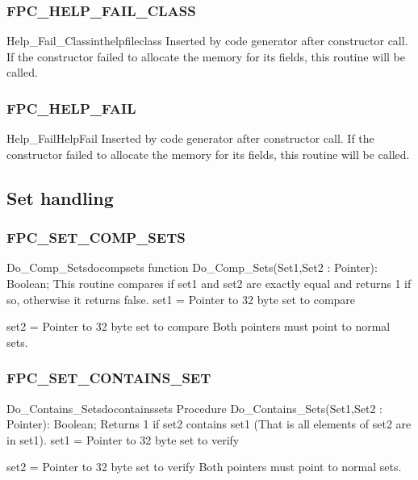 \documentclass [a4paper,12pt]{article}
\begin{document}
\subsubsection{FPC{\_}HELP{\_}FAIL{\_}CLASS}
\label{subsubsec:mylabel84}

\begin{functionl}{Help{\_}Fail{\_}Class}{inthelpfileclass}
\Description
Inserted by code generator after constructor call. If the constructor failed
to allocate the memory for its fields, this routine will be called.
\end{functionl}

\subsubsection{FPC{\_}HELP{\_}FAIL}
\label{subsubsec:mylabel85}

\begin{functionl}{Help{\_}Fail}{HelpFail}
\Description
Inserted by code generator after constructor call. If the constructor failed
to allocate the memory for its fields, this routine will be called.
\end{functionl}

\subsection{Set handling}
\label{subsec:mylabel10}

\subsubsection{FPC{\_}SET{\_}COMP{\_}SETS}
\label{subsubsec:mylabel86}

\begin{functionl}{Do{\_}Comp{\_}Sets}{docompsets}
\Declaration
function Do{\_}Comp{\_}Sets(Set1,Set2 : Pointer): Boolean;
\Description
This routine compares if set1 and set2 are exactly equal and returns 1 if
so, otherwise it returns false.
\Parameters
set1 = Pointer to 32 byte set to compare \par
set2 = Pointer to 32 byte set to compare
\Notes
Both pointers must point to normal sets.
\end{functionl}

\subsubsection{FPC{\_}SET{\_}CONTAINS{\_}SET}
\label{subsubsec:mylabel87}

\begin{procedurel}{Do{\_}Contains{\_}Sets}{docontainssets}
\Declaration
Procedure Do{\_}Contains{\_}Sets(Set1,Set2 : Pointer): Boolean;
\Description
Returns 1 if set2 contains set1 (That is all elements of set2 are in set1).
\Parameters
set1 = Pointer to 32 byte set to verify \par
set2 = Pointer to 32 byte set to verify
\Notes
Both pointers must point to normal sets.
\end{procedurel}
\end{document}
